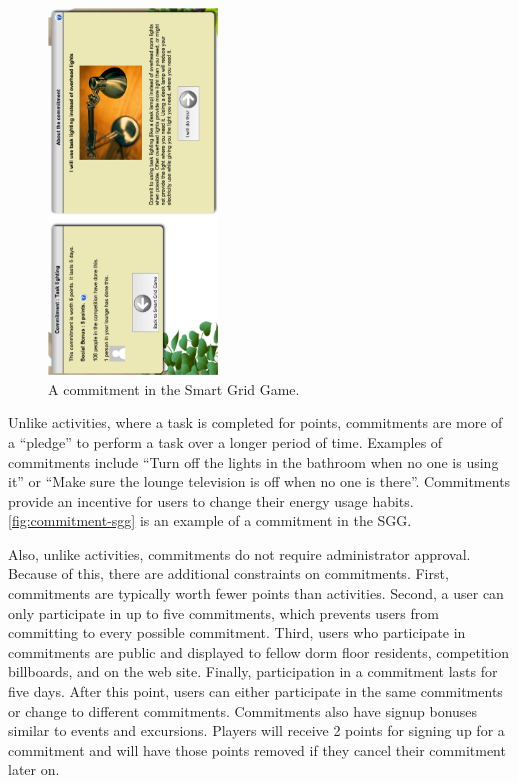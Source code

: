 \begin{figure}[h]
  \center
  \includegraphics[width=0.4\textwidth]{images/commitment.eps}
  \caption{A commitment in the Smart Grid Game.}
  \label{fig:commitment-sgg}
\end{figure}

Unlike activities, where a task is completed for points, commitments are more of a ``pledge'' to perform a task over a longer period of time.  Examples of commitments include ``Turn off the lights in the bathroom when no one is using it'' or ``Make sure the lounge television is off when no one is there''.  Commitments provide an incentive for users to change their energy usage habits. \autoref{fig:commitment-sgg} is an example of a commitment in the SGG.

Also, unlike activities, commitments do not require administrator approval.  Because of this, there are additional constraints on commitments.  First, commitments are typically worth fewer points than activities.  Second, a user can only participate in up to five commitments, which prevents users from committing to every possible commitment.  Third, users who participate in commitments are public and displayed to fellow dorm floor residents, competition billboards, and on the web site.  Finally, participation in a commitment lasts for five days.  After this point, users can either participate in the same commitments or change to different commitments.  Commitments also have signup bonuses similar to events and excursions.  Players will receive 2 points for signing up for a commitment and will have those points removed if they cancel their commitment later on.


